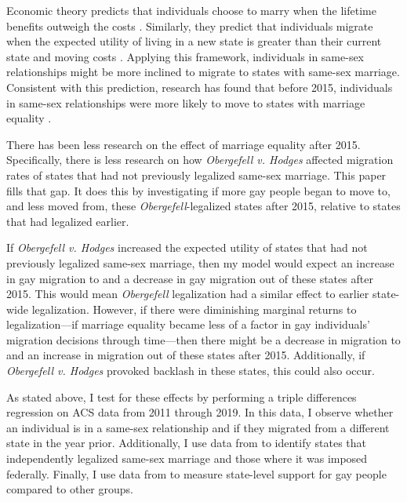 \documentclass[12pt,letterpaper]{article}
\begin{document}
Economic theory predicts that individuals choose to marry when the lifetime benefits outweigh the costs \citep{9}. Similarly, they predict that individuals migrate when the expected utility of living in a new state is greater than their current state and moving costs \citep{8, 12}. Applying this framework, individuals in same-sex relationships might be more inclined to migrate to states with same-sex marriage. Consistent with this prediction, research has found that before 2015, individuals in same-sex relationships were more likely to move to states with marriage equality \citep{1, 12}. 

There has been less research on the effect of marriage equality after 2015. Specifically, there is less research on how \textit{Obergefell v. Hodges} affected migration rates of states that had not previously legalized same-sex marriage. This paper fills that gap. It does this by investigating if more gay people began to move to, and less moved from, these \textit{Obergefell}-legalized states after 2015, relative to states that had legalized earlier. 

If \textit{Obergefell v. Hodges} increased the expected utility of states that had not previously legalized same-sex marriage, then my model would expect an increase in gay migration to and a decrease in gay migration out of these states after 2015. This would mean \textit{Obergefell} legalization had a similar effect to earlier state-wide legalization. However, if there were diminishing marginal returns to legalization—if marriage equality became less of a factor in gay individuals' migration decisions through time—then there might be a decrease in migration to and an increase in migration out of these states after 2015. Additionally, if \textit{Obergefell v. Hodges} provoked backlash in these states, this could also occur.

As stated above, I test for these effects by performing a triple differences regression on ACS data from 2011 through 2019. In this data, I observe whether an individual is in a same-sex relationship and if they migrated from a different state in the year prior. Additionally, I use data from \citet{27} to identify states that independently legalized same-sex marriage and those where it was imposed federally. Finally, I use data from \citet{29} to measure state-level support for gay people compared to other groups.
\end{document}
